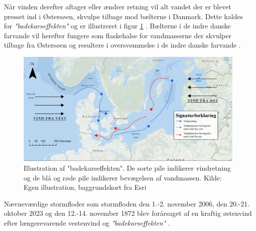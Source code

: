 Når vinden derefter aftager eller ændrer retning vil alt vandet der er blevet presset ind i Østersøen, skvulpe tilbage mod bælterne i Danmark. Dette kaldes for \textit{"badekarseffekten"} og er illustreret i figur \ref{Figur: Bathtub effect} \citep{kystdirektoratet_stormfloder, egusphere_baltic}. Bælterne i de indre danske farvande vil herefter fungere som flaskehalse for vandmasserne der skvulper tilbage fra Østersøen og resultere i oversvømmelse i de indre danske farvande \citep{egusphere_baltic}.
\begin{figure}[H]
    \centering
    \includegraphics[width=0.8\linewidth]{images/teori/bathtub effect graphics.jpg}
    \caption{Illustration af "badekarseffekten". De sorte pile indikerer vindretning og de blå og røde pile indikerer bevægelsen af vandmassen. Kilde: Egen illustration, baggrundskort fra Esri}
    \label{Figur: Bathtub effect}
\end{figure}
Nævneværdige stormfloder som stormfloden den 1.-2. november 2006, den 20.-21. oktober 2023 og den 12.-14. november 1872 blev forårsaget af en kraftig østenvind efter længerevarende vestenvind og \textit{"badekarseffekten"} \citep{kystdirektoratet_stormfloder}.

